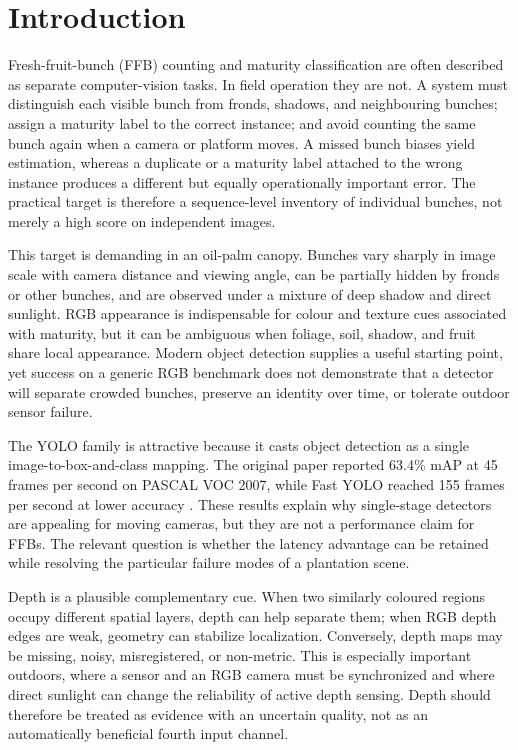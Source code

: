 
\section{Introduction}

Fresh-fruit-bunch (FFB) counting and maturity classification are often described as separate computer-vision tasks. In field operation they are not. A system must distinguish each visible bunch from fronds, shadows, and neighbouring bunches; assign a maturity label to the correct instance; and avoid counting the same bunch again when a camera or platform moves. A missed bunch biases yield estimation, whereas a duplicate or a maturity label attached to the wrong instance produces a different but equally operationally important error. The practical target is therefore a sequence-level inventory of individual bunches, not merely a high score on independent images.

This target is demanding in an oil-palm canopy. Bunches vary sharply in image scale with camera distance and viewing angle, can be partially hidden by fronds or other bunches, and are observed under a mixture of deep shadow and direct sunlight. RGB appearance is indispensable for colour and texture cues associated with maturity, but it can be ambiguous when foliage, soil, shadow, and fruit share local appearance. Modern object detection supplies a useful starting point, yet success on a generic RGB benchmark does not demonstrate that a detector will separate crowded bunches, preserve an identity over time, or tolerate outdoor sensor failure.

The YOLO family is attractive because it casts object detection as a single image-to-box-and-class mapping. The original paper reported 63.4\% mAP at 45 frames per second on PASCAL VOC 2007, while Fast YOLO reached 155 frames per second at lower accuracy \cite{redmon2016yolo}. These results explain why single-stage detectors are appealing for moving cameras, but they are not a performance claim for FFBs. The relevant question is whether the latency advantage can be retained while resolving the particular failure modes of a plantation scene.

Depth is a plausible complementary cue. When two similarly coloured regions occupy different spatial layers, depth can help separate them; when RGB depth edges are weak, geometry can stabilize localization. Conversely, depth maps may be missing, noisy, misregistered, or non-metric. This is especially important outdoors, where a sensor and an RGB camera must be synchronized and where direct sunlight can change the reliability of active depth sensing. Depth should therefore be treated as evidence with an uncertain quality, not as an automatically beneficial fourth input channel.

